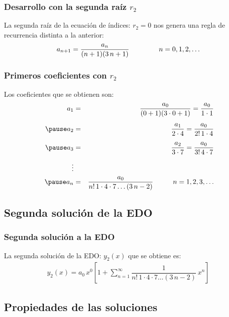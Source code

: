 \documentclass[12pt]{beamer}
\begin{document}
\begin{frame}
\frametitle{Desarrollo con la segunda raíz $r_{2}$}
La segunda raíz de la ecuación de índices: $r_{2} = 0$ nos genera una regla de recurrencia distinta a la anterior:
\begin{align}
a_{n+1} = \dfrac{a_{n}}{(n+1)(3 \, n +1)} \hspace{1.5cm} n = 0, 1, 2, \ldots
\label{eq:ecuacion_09}    
\end{align}
\end{frame}
\begin{frame}
\frametitle{Primeros coeficientes con $r_{2}$}
Los coeficientes que se obtienen son:
\begin{eqnarray*}
a_{1} &=& \dfrac{a_{0}}{(0+1)(3 \cdot 0 +1)} = \dfrac{a_{0}}{1 \cdot 1} \\[0.5em] \pause
a_{2} &=& \dfrac{a_{1}}{2 \cdot 4} = \dfrac{a_{0}}{2! \, 1 \cdot 4}  \\[0.5em] \pause
a_{3} &=& \dfrac{a_{2}}{3 \cdot 7} = \dfrac{a_{0}}{3! \, 4 \cdot 7}  \\[0.5em]
\vdots \\ \pause
a_{n} &=& \dfrac{a_{0}}{n! \, 1 \cdot 4 \cdot 7 \ldots (3 \, n - 2)} \hspace{1cm} n = 1, 2, 3, \ldots
\end{eqnarray*}
\end{frame}

\subsection*{Segunda solución de la EDO}

\begin{frame}
\frametitle{Segunda solución a la EDO}
La segunda solución de la EDO: $y_{2}(x)$ que se obtiene es:
\begin{align}
y_{2}(x) = a_{0} \, x^{0} \left[ 1 + \sum_{n=1}^{\infty} \dfrac{1}{n! \, 1 \cdot 4 \cdot 7 \ldots (3\, n - 2)} \, x^{n} \right]
\label{eq:ecuacion_11}
\end{align}    
\end{frame}

\subsection*{Propiedades de las soluciones}
\end{document}

